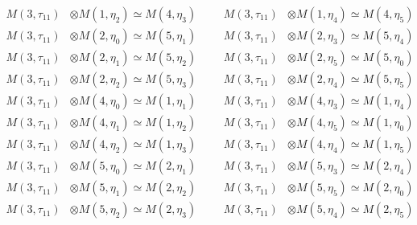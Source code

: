 \begin{align*}
M(3,\tau_{11}) &\otimes M(1,\eta_{2}) \simeq M(4,\eta_{3}) &&& M(3,\tau_{11}) &\otimes M(1,\eta_{4}) \simeq M(4,\eta_{5})\\
M(3,\tau_{11}) &\otimes M(2,\eta_{0}) \simeq M(5,\eta_{1}) &&& M(3,\tau_{11}) &\otimes M(2,\eta_{3}) \simeq M(5,\eta_{4})\\
M(3,\tau_{11}) &\otimes M(2,\eta_{1}) \simeq M(5,\eta_{2}) &&& M(3,\tau_{11}) &\otimes M(2,\eta_{5}) \simeq M(5,\eta_{0})\\
M(3,\tau_{11}) &\otimes M(2,\eta_{2}) \simeq M(5,\eta_{3}) &&& M(3,\tau_{11}) &\otimes M(2,\eta_{4}) \simeq M(5,\eta_{5})\\
M(3,\tau_{11}) &\otimes M(4,\eta_{0}) \simeq M(1,\eta_{1}) &&& M(3,\tau_{11}) &\otimes M(4,\eta_{3}) \simeq M(1,\eta_{4})\\
M(3,\tau_{11}) &\otimes M(4,\eta_{1}) \simeq M(1,\eta_{2}) &&& M(3,\tau_{11}) &\otimes M(4,\eta_{5}) \simeq M(1,\eta_{0})\\
M(3,\tau_{11}) &\otimes M(4,\eta_{2}) \simeq M(1,\eta_{3}) &&& M(3,\tau_{11}) &\otimes M(4,\eta_{4}) \simeq M(1,\eta_{5})\\
M(3,\tau_{11}) &\otimes M(5,\eta_{0}) \simeq M(2,\eta_{1}) &&& M(3,\tau_{11}) &\otimes M(5,\eta_{3}) \simeq M(2,\eta_{4})\\
M(3,\tau_{11}) &\otimes M(5,\eta_{1}) \simeq M(2,\eta_{2}) &&& M(3,\tau_{11}) &\otimes M(5,\eta_{5}) \simeq M(2,\eta_{0})\\
M(3,\tau_{11}) &\otimes M(5,\eta_{2}) \simeq M(2,\eta_{3}) &&& M(3,\tau_{11}) &\otimes M(5,\eta_{4}) \simeq M(2,\eta_{5})\\
\end{align*}

